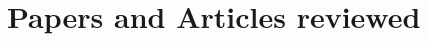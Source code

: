 \documentclass[a4paper]{article}
\title{\docTitle}
\author{\docAuthor}
\date{}
\begin{document}
    \maketitle
    \flushbottom
    \tableofcontents
    \clearpage

    

    \chapter{Papers and Articles reviewed}\label{ch:papers-reviewed}
    
    
    
    
    

    \clearpage
    \appendix
    \printbibliography
\end{document}
